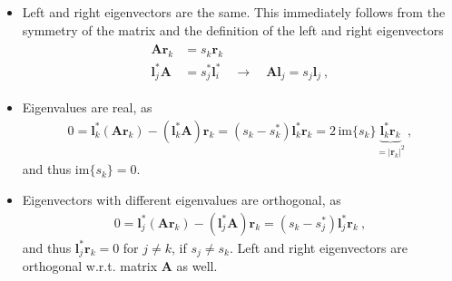 \documentclass[letterpaper,10pt,english]{jupyterBook}
\begin{document}
\begin{itemize}
\item {} 
\sphinxAtStartPar
Left and right eigenvectors are the same. This immediately follows from the symmetry of the matrix and the definition of the left and right eigenvectors
\begin{equation*}
\begin{split}\begin{aligned}
     \mathbf{A} \mathbf{r}_k   & = s_k \mathbf{r}_k \\
     \mathbf{l}_j^* \mathbf{A} & = s^*_j \mathbf{l}_i^* \quad \rightarrow \quad \mathbf{A} \mathbf{l}_j = s_j \mathbf{l}_j \ ,
   \end{aligned}\end{split}
\end{equation*}
\item {} 
\sphinxAtStartPar
Eigenvalues are real, as
\begin{equation*}
\begin{split}0 = \mathbf{l}^*_k \left( \mathbf{A} \mathbf{r}_k \right) - \left( \mathbf{l}_k^* \mathbf{A} \right) \mathbf{r}_k = \left( s_k - s^*_k \right) \mathbf{l}^*_k \mathbf{r}_k = 2 \, \text{im}\{ s_k \} \underbrace{\mathbf{l}^*_k \mathbf{r}_k}_{ = | \mathbf{r}_k |^2} \ ,\end{split}
\end{equation*}
\sphinxAtStartPar
and thus \(\text{im} \{ s_k \} = 0\).

\item {} 
\sphinxAtStartPar
Eigenvectors with different eigenvalues are orthogonal, as
\begin{equation*}
\begin{split}0 = \mathbf{l}^*_j \left( \mathbf{A} \mathbf{r}_k \right) - \left( \mathbf{l}_j^* \mathbf{A} \right) \mathbf{r}_k = \left( s_k - s^*_j \right) \mathbf{l}^*_j \mathbf{r}_k \ ,\end{split}
\end{equation*}
\sphinxAtStartPar
and thus \(\mathbf{l}^*_j \mathbf{r}_k = 0\) for \(j \ne k\), if \(s_j \ne s_k\). Left and right eigenvectors are orthogonal w.r.t. matrix \(\mathbf{A}\) as well.

\end{itemize}

\sphinxstepscope
\end{document}
